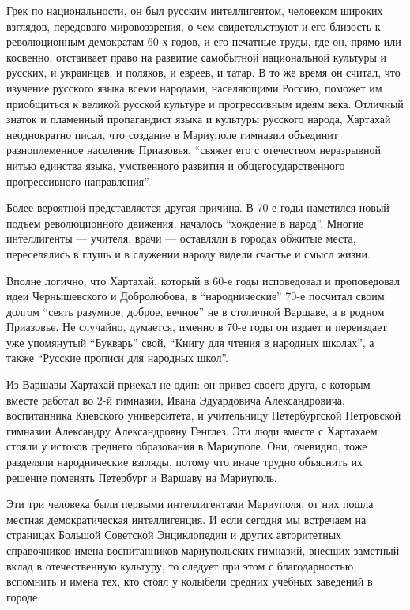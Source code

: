 Грек по национальности, он был русским интеллигентом, человеком широких
взглядов, передового мировоззрения, о чем свидетельствуют и его близость к
революционным демократам 60-х годов, и его печатные труды, где он, прямо или
косвенно, отстаивает право на развитие самобытной национальной культуры и
русских, и украинцев, и поляков, и евреев, и татар. В то же время он считал,
что изучение русского языка всеми народами, населяющими Россию, поможет им
приобщиться к великой русской культуре и прогрессивным идеям века. Отличный
знаток и пламенный пропагандист языка и культуры русского народа, Хартахай
неоднократно писал, что создание в Мариуполе гимназии объединит разноплеменное
население Приазовья, \enquote{свяжет его с отечеством неразрывной нитью единства
языка, умственного развития и общегосударственного прогрессивного
направления}.

Более вероятной представляется другая причина. В 70-е годы наметился новый
подъем революционного движения, началось \enquote{хождение в народ}. Многие
интеллигенты — учителя, врачи — оставляли в городах обжитые места,
переселялись в глушь и в служении народу видели счастье и смысл жизни.

Вполне логично, что Хартахай, который в 60-е годы исповедовал и проповедовал
идеи Чернышевского и Добролюбова, в \enquote{народнические} 70-е посчитал своим долгом
\enquote{сеять разумное, доброе, вечное} не в столичной Варшаве, а в родном Приазовье.
Не случайно, думается, именно в 70-е годы он издает и переиздает уже
упомянутый \enquote{Букварь} свой, \enquote{Книгу для чтения в народных школах}, а также
\enquote{Русские прописи для народных школ}.

Из Варшавы Хартахай приехал не один: он привез своего друга, с которым вместе
рабо­тал во 2-й гимназии, Ивана Эдуардовича Александровича, воспитанника
Киевского университета, и учительницу Петербургской Петровской гимназии
Александру Александровну Генглез. Эти люди вместе с Хартахаем стояли у истоков
среднего образования в Мариуполе. Они, очевидно, тоже разделяли народнические
взгляды, потому что иначе трудно объяснить их решение поменять Петербург и
Варшаву на Мариуполь.

Эти три человека были первыми интеллигентами Мариуполя, от них пошла местная
демократическая интеллигенция. И если сегодня мы встречаем на страницах
Большой Советской Энциклопедии и других авторитетных справочников имена
воспитанников мариупольских гимназий, внесших заметный вклад в отечественную
культуру, то следует при этом с благодарностью вспомнить и имена тех, кто стоял
у колыбели средних учебных заведений в городе.

